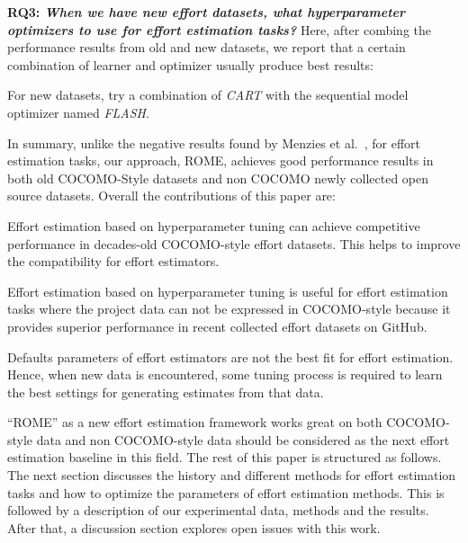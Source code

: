 {\bf RQ3: \em When we have new effort datasets, what hyperparameter optimizers to use for effort estimation tasks?} Here, after combing the performance results from old and new datasets, we report that a certain combination  of learner and optimizer usually
produce best results:
\begin{result}{3}
For new datasets, try a combination of {\em CART} with the sequential model optimizer named {\em FLASH}.
\end{result}


In summary, unlike the negative results found by Menzies et al.~\cite{MenziesNeg:2017}, for effort estimation tasks, our approach, ROME, achieves good performance results in both old COCOMO-Style datasets and non COCOMO newly collected open source datasets. Overall the contributions of this paper are:
\bi
\item Effort estimation based on hyperparameter tuning can achieve competitive performance in  decades-old COCOMO-style effort datasets. This helps to improve the compatibility for effort estimators. 

\item  Effort estimation based on hyperparameter tuning is useful for  effort estimation tasks where the project data can not be expressed in COCOMO-style because it provides superior performance in recent collected effort datasets on GitHub.

\item Defaults parameters of effort estimators are not the best fit for effort estimation. Hence, when new
data is encountered, some tuning process is required
to learn the best settings for generating estimates
from that data.

\item ``ROME'' as a new effort estimation framework works great on both COCOMO-style data and non COCOMO-style data should be considered as the next effort estimation baseline in this field.
\ei
The rest of this paper is structured as follows.
The next section discusses the history and different methods for effort estimation tasks and how to optimize
the parameters of effort estimation methods. This is followed by a description of our experimental data, methods and the results. After that, a discussion section explores open issues with this work. 

